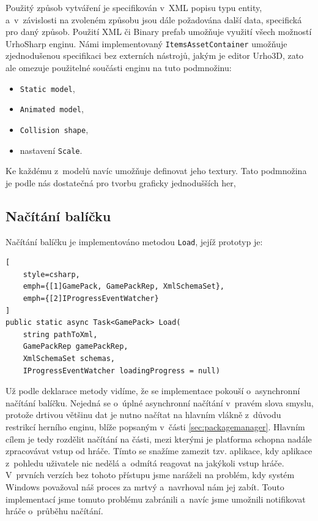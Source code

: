 Použitý způsob vytváření je specifikován v~XML popisu typu entity, a~v~závislosti na zvoleném způsobu jsou dále požadována další data, specifická pro daný způsob. Použití XML či Binary prefab umožňuje využití všech možností UrhoSharp enginu. Námi implementovaný \texttt{ItemsAssetContainer} umožňuje zjednodušenou specifikaci bez externích nástrojů, jakým je editor Urho3D, zato ale omezuje použitelné součásti enginu na tuto podmnožinu:

\begin{itemize}
	\item \texttt{Static model},
	\item \texttt{Animated model},
	\item \texttt{Collision shape},
	\item nastavení \texttt{Scale}.
\end{itemize}

Ke každému z~modelů navíc umožňuje definovat jeho textury. Tato podmnožina je podle nás dostatečná pro tvorbu graficky jednodušších her,

\subsection{Načítání balíčku}
\label{sec:packageloading}

Načítání balíčku je implementováno metodou \texttt{Load}, jejíž prototyp je:

\begin{lstlisting}[
	style=csharp,
	emph={[1]GamePack, GamePackRep, XmlSchemaSet}, 
	emph={[2]IProgressEventWatcher}
]
public static async Task<GamePack> Load(
	string pathToXml,
	GamePackRep gamePackRep,
	XmlSchemaSet schemas,
	IProgressEventWatcher loadingProgress = null)
\end{lstlisting}

Už podle deklarace metody vidíme, že se implementace pokouší o~asynchronní načítání balíčku. Nejedná se o~úplné asynchronní načítání v~pravém slova smyslu, protože drtivou většinu dat je nutno načítat na hlavním vlákně z~důvodu restrikcí herního enginu, blíže popsaným v~části \ref{sec:packagemanager}. Hlavním cílem je tedy rozdělit načítání na části, mezi kterými je platforma schopna nadále zpracovávat vstup od hráče. Tímto se snažíme zamezit tzv.  aplikace, kdy aplikace z~pohledu uživatele nic nedělá a~odmítá reagovat na jakýkoli vstup hráče. V~prvních verzích bez tohoto přístupu jsme naráželi na problém, kdy systém Windows považoval náš proces za mrtvý a~navrhoval nám jej zabít. Touto implementací jsme tomuto problému zabránili a~navíc jsme umožnili notifikovat hráče o~průběhu načítání.

